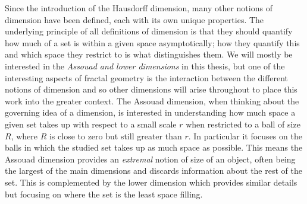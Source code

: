Since the introduction of the Hausdorff dimension, many other notions of dimension have been defined, each with its own unique properties. The underlying principle of all definitions of dimension is that they should quantify how much of a set is within a given space asymptotically; how they quantify this and which space they restrict to is what distinguishes them. We will mostly be interested in the \textit{Assouad and lower dimensions} in this thesis, but one of the interesting aspects of fractal geometry is the interaction between the different notions of dimension and so other dimensions will arise throughout to place this work into the greater context. The Assouad dimension, when thinking about the governing idea of a dimension, is interested in understanding how much space a given set takes up with respect to a small scale $r$ when restricted to a ball of size $R$, where $R$ is close to zero but still greater than $r$. In particular it focuses on the balls in which the studied set takes up as much space as possible. This means the Assouad dimension provides an \textit{extremal} notion of size of an object, often being the largest of the main dimensions and discards information about the rest of the set. This is complemented by the lower dimension which provides similar details but focusing on where the set is the least space filling.  




